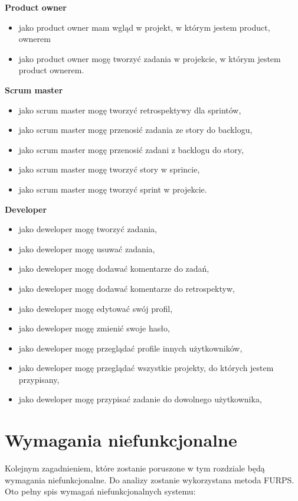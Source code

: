 \textbf{Product owner}
\begin{itemize}	
	\item jako product owner mam wgląd w projekt, w którym jestem product, ownerem	
	\item jako product owner mogę tworzyć zadania w projekcie, w którym jestem product ownerem.
\end{itemize}	
\textbf{Scrum master}
\begin{itemize}		
	\item jako scrum master mogę tworzyć retrospektywy dla sprintów,
	\item jako scrum master mogę przenosić zadania ze story do backlogu,
	\item jako scrum master mogę przenosić zadani z backlogu do story,
	\item jako scrum master mogę tworzyć story w sprincie,
	\item jako scrum master mogę tworzyć sprint w projekcie.
\end{itemize}
\textbf{Developer}
\begin{itemize}		
	\item jako deweloper mogę tworzyć zadania,
	\item jako deweloper mogę usuwać zadania,
	\item jako deweloper mogę dodawać komentarze do zadań,
	\item jako deweloper mogę dodawać komentarze do retrospektyw,
	\item jako deweloper mogę edytować swój profil,
	\item jako deweloper mogę zmienić swoje hasło,
	\item jako deweloper mogę przeglądać profile innych użytkowników,
	\item jako deweloper mogę przeglądać wszystkie projekty, do których jestem przypisany,
	\item jako deweloper mogę przypisać zadanie do dowolnego użytkownika,
	
\end{itemize}

\section{Wymagania niefunkcjonalne}
Kolejnym zagadnieniem, które zostanie poruszone w tym rozdziale będą wymagania niefunkcjonalne. Do analizy zostanie wykorzystana metoda FURPS. Oto pełny spis wymagań niefunkcjonalnych systemu:

